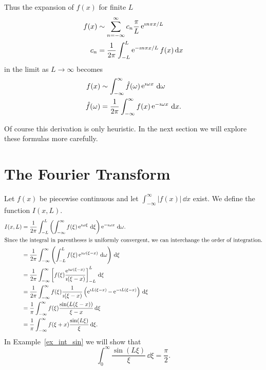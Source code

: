 Thus the expansion of $f(x)$ for finite $L$
\begin{align*}
  f(x) &\sim \sum_{n = - \infty}^\infty c_n \frac{\pi}{L} \mathop{\mathrm{e}}\nolimits^{\imath n \pi x / L} \\
  c_n &= \frac{1}{2\pi} \int_{-L}^L \mathop{\mathrm{e}}\nolimits^{-\imath n \pi x / L} f(x)\,\mathrm{d} x
\end{align*}
in the limit as $L \to \infty$ becomes
\begin{align*}
  f(x) &\sim \int_{-\infty}^\infty \hat{f}(\omega) \mathop{\mathrm{e}}\nolimits^{\imath \omega x}\,\mathrm{d} \omega \\
  \hat{f}(\omega) &= \frac{1}{2\pi} \int_{-\infty}^\infty f(x) \mathop{\mathrm{e}}\nolimits^{-\imath \omega x} \,\mathrm{d} x.
\end{align*}

Of course this derivation is only heuristic.  In the next section we will
explore these formulas more carefully.









\section{The Fourier Transform}



Let $f(x)$ be piecewise continuous and let $\int_{-\infty}^\infty |f(x)|\,\dd x$
exist.  We define the function $I(x,L)$.
\begin{align*}
  I(x,L)  
  &= \frac{1}{2\pi} \int_{-L}^L \left( \int_{-\infty}^\infty f(\xi) \mathop{\mathrm{e}}\nolimits^{\imath \omega \xi}\,\mathrm{d} \xi \right) 
  \mathop{\mathrm{e}}\nolimits^{-\imath \omega x}\,\mathrm{d} \omega. 
  \\
  \intertext{Since the integral in parentheses is uniformly convergent,
    we can interchange the order of integration.}
  &= \frac{1}{2\pi} \int_{-\infty}^\infty \left( \int_{-L}^L f(\xi) \mathop{\mathrm{e}}\nolimits^{\imath \omega (\xi-x)}\,\mathrm{d} \omega \right)\,\mathrm{d} \xi 
  \\
  &= \frac{1}{2\pi} \int_{-\infty}^\infty \left[ f(\xi) 
    \frac{\mathop{\mathrm{e}}\nolimits^{\imath \omega (\xi - x)}}{\imath (\xi - x)} \right]_{-L}^L \,\mathrm{d} \xi 
  \\
  &= \frac{1}{2\pi} \int_{-\infty}^\infty f(\xi) \frac{1}{\imath (\xi - x)}
  \left(\mathop{\mathrm{e}}\nolimits^{\imath L (\xi-x)} - \mathop{\mathrm{e}}\nolimits^{-\imath L (\xi - x)} \right)\,\mathrm{d} \xi 
  \\
  &= \frac{1}{\pi} \int_{-\infty}^\infty f(\xi) \frac{\sin(L(\xi - x))}{\xi-x} \,\mathrm{d} \xi 
  \\
  &= \frac{1}{\pi} \int_{-\infty}^\infty f(\xi+x) \frac{\sin(L\xi)}{\xi} \,\mathrm{d} \xi.
\end{align*}
In Example~\ref{ex_int_sin} we will show that 
\[ 
\int_0^\infty \frac{\sin(L \xi)}{\xi}\,\dd \xi = \frac{\pi}{2}.
\]

